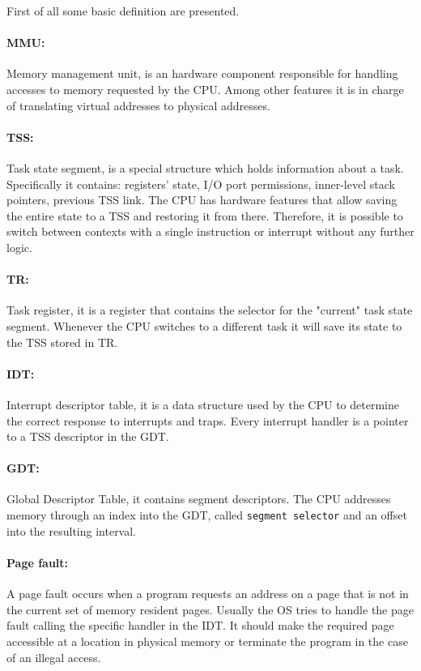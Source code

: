 \documentclass[11pt,twoside,a4paper]{article}
\begin{document}
First of all some basic definition are presented.

\paragraph{MMU: } Memory management unit, is an hardware component responsible for handling accesses to memory requested by the CPU. Among other features it is in charge of translating virtual addresses to physical addresses.

\paragraph{TSS: } Task state segment, is a special structure which holds information about a task. Specifically it contains: registers' state, I/O port permissions, inner-level stack pointers, previous TSS link. The CPU has hardware features that allow saving the entire state to a TSS and restoring it from there. Therefore, it is possible to switch between contexts with a single instruction or interrupt without any further logic.

\paragraph{TR: } Task register, it is a register that contains the selector for the "current" task state segment. Whenever the CPU switches to a different task it will save its state to the TSS stored in TR.

\paragraph{IDT: } Interrupt descriptor table, it is a data structure used by the CPU to determine the correct response to interrupts and traps. Every interrupt handler is a pointer to a TSS descriptor in the GDT.

\paragraph{GDT: } Global Descriptor Table, it contains segment descriptors. The CPU addresses memory through an index into the GDT, called \texttt{segment selector} and an offset into the resulting interval.

\paragraph{Page fault: } A page fault occurs when a program requests an address on a page that is not in the current set of memory resident pages. Usually the OS tries to handle the page fault calling the specific handler in the IDT. It should make the required page accessible at a location in physical memory or terminate the program in the case of an illegal access.
\end{document}
